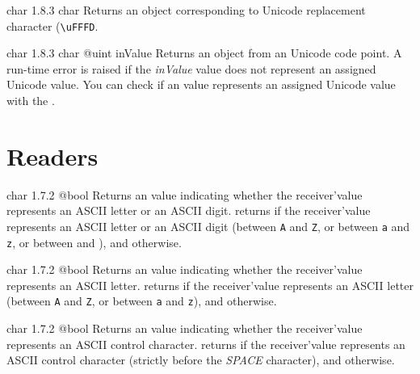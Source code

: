 {char}
{1.8.3}
{char}
{Returns an  object corresponding to Unicode replacement character (\texttt{\textquotesingle\textbackslash uFFFD}.}
{}







{char}
{1.8.3}
{char}
{@uint inValue}
{Returns an  object from an Unicode code point.}
{A run-time error is raised if the \emph{inValue} value does not represent an assigned Unicode value. You can check if an  value represents an assigned Unicode value with the .}


\section{Readers}


{char}
{1.7.2}
{@bool}
{Returns an  value indicating whether the receiver'value represents an ASCII letter or an ASCII digit.}
{returns  if the receiver'value represents an ASCII letter or an ASCII digit (between \texttt{\textquotesingle A\textquotesingle} and \texttt{\textquotesingle Z\textquotesingle}, or between \texttt{\textquotesingle a\textquotesingle} and \texttt{\textquotesingle z\textquotesingle}, or between \texttt{\textquotesingle} and \texttt{\textquotesingle}), and  otherwise.}




{char}
{1.7.2}
{@bool}
{Returns an  value indicating whether the receiver'value represents an ASCII letter.}
{returns  if the receiver'value represents an ASCII letter (between \texttt{\textquotesingle A\textquotesingle} and \texttt{\textquotesingle Z\textquotesingle}, or between \texttt{\textquotesingle a\textquotesingle} and \texttt{\textquotesingle z\textquotesingle}), and  otherwise.}




{char}
{1.7.2}
{@bool}
{Returns an  value indicating whether the receiver'value represents an ASCII control character.}
{returns  if the receiver'value represents an ASCII control character (strictly before the \emph{SPACE} character), and  otherwise.}





